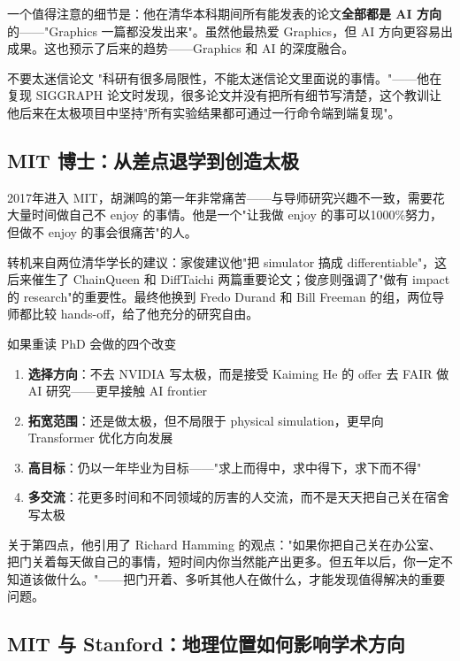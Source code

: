 \documentclass[a4paper]{article}
\begin{document}
一个值得注意的细节是：他在清华本科期间所有能发表的论文\textbf{全部都是 AI 方向}的——"Graphics 一篇都没发出来"。虽然他最热爱 Graphics，但 AI 方向更容易出成果。这也预示了后来的趋势——Graphics 和 AI 的深度融合。

\begin{warningbox}{不要太迷信论文}
"科研有很多局限性，不能太迷信论文里面说的事情。"——他在复现 SIGGRAPH 论文时发现，很多论文并没有把所有细节写清楚，这个教训让他后来在太极项目中坚持"所有实验结果都可通过一行命令端到端复现"。
\end{warningbox}

\subsection{MIT 博士：从差点退学到创造太极}

2017年进入 MIT，胡渊鸣的第一年非常痛苦——与导师研究兴趣不一致，需要花大量时间做自己不 enjoy 的事情。他是一个"让我做 enjoy 的事可以1000\%努力，但做不 enjoy 的事会很痛苦"的人。

转机来自两位清华学长的建议：家俊建议他"把 simulator 搞成 differentiable"，这后来催生了 ChainQueen 和 DiffTaichi 两篇重要论文；俊彦则强调了"做有 impact 的 research"的重要性。最终他换到 Fredo Durand 和 Bill Freeman 的组，两位导师都比较 hands-off，给了他充分的研究自由。

\begin{importantbox}{如果重读 PhD 会做的四个改变}
\begin{enumerate}
\item \textbf{选择方向}：不去 NVIDIA 写太极，而是接受 Kaiming He 的 offer 去 FAIR 做 AI 研究——更早接触 AI frontier
\item \textbf{拓宽范围}：还是做太极，但不局限于 physical simulation，更早向 Transformer 优化方向发展
\item \textbf{高目标}：仍以一年毕业为目标——"求上而得中，求中得下，求下而不得"
\item \textbf{多交流}：花更多时间和不同领域的厉害的人交流，而不是天天把自己关在宿舍写太极
\end{enumerate}
\end{importantbox}

关于第四点，他引用了 Richard Hamming 的观点："如果你把自己关在办公室、把门关着每天做自己的事情，短时间内你当然能产出更多。但五年以后，你一定不知道该做什么。"——把门开着、多听其他人在做什么，才能发现值得解决的重要问题。

\subsection{MIT 与 Stanford：地理位置如何影响学术方向}
\end{document}
